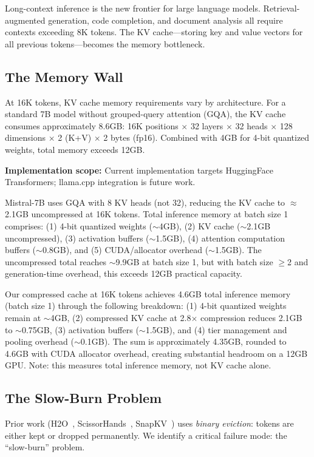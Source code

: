 \documentclass[11pt]{article}
\begin{document}
Long-context inference is the new frontier for large language models. Retrieval-augmented generation, code completion, and document analysis all require contexts exceeding 8K tokens. The KV cache---storing key and value vectors for all previous tokens---becomes the memory bottleneck.

\subsection{The Memory Wall}

At 16K tokens, KV cache memory requirements vary by architecture. For a standard 7B model without grouped-query attention (GQA), the KV cache consumes approximately 8.6GB: 16K positions $\times$ 32 layers $\times$ 32 heads $\times$ 128 dimensions $\times$ 2 (K+V) $\times$ 2 bytes (fp16). Combined with 4GB for 4-bit quantized weights, total memory exceeds 12GB.

\textbf{Implementation scope:} Current implementation targets HuggingFace Transformers; llama.cpp integration is future work.

Mistral-7B uses GQA with 8 KV heads (not 32), reducing the KV cache to $\approx$2.1GB uncompressed at 16K tokens. Total inference memory at batch size 1 comprises: (1) 4-bit quantized weights ($\sim$4GB), (2) KV cache ($\sim$2.1GB uncompressed), (3) activation buffers ($\sim$1.5GB), (4) attention computation buffers ($\sim$0.8GB), and (5) CUDA/allocator overhead ($\sim$1.5GB). The uncompressed total reaches $\sim$9.9GB at batch size 1, but with batch size $\geq$2 and generation-time overhead, this exceeds 12GB practical capacity.

Our compressed cache at 16K tokens achieves 4.6GB total inference memory (batch size 1) through the following breakdown: (1) 4-bit quantized weights remain at $\sim$4GB, (2) compressed KV cache at 2.8$\times$ compression reduces 2.1GB to $\sim$0.75GB, (3) activation buffers ($\sim$1.5GB), and (4) tier management and pooling overhead ($\sim$0.1GB). The sum is approximately 4.35GB, rounded to 4.6GB with CUDA allocator overhead, creating substantial headroom on a 12GB GPU. Note: this measures total inference memory, not KV cache alone.

\subsection{The Slow-Burn Problem}

Prior work (H2O~\cite{h2o}, ScissorHands~\cite{scissorhands}, SnapKV~\cite{snapkv}) uses \textit{binary eviction}: tokens are either kept or dropped permanently. We identify a critical failure mode: the ``slow-burn'' problem.
\end{document}
